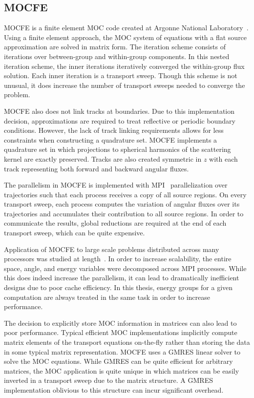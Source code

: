 \subsection{MOCFE}
\label{sec:mocfe}

MOCFE is a finite element \ac{MOC} code created at Argonne National Laboratory~\cite{mocfe_init}. Using a finite element approach, the \ac{MOC} system of equations with a flat source approximation are solved in matrix form. The iteration scheme consists of iterations over between-group and within-group components. In this nested iteration scheme, the inner iterations iteratively converged the within-group flux solution. Each inner iteration is a transport sweep. Though this scheme is not unusual, it does increase the number of transport sweeps needed to converge the problem.

MOCFE also does not link tracks at boundaries. Due to this implementation decision, approximations are required to treat reflective or periodic boundary conditions. However, the lack of track linking requirements allows for less constraints when constructing a quadrature set. MOCFE implements a quadrature set in which projections to spherical harmonics of the scattering kernel are exactly preserved. Tracks are also created symmetric in $z$ with each track representing both forward and backward angular fluxes.

The parallelism in MOCFE is implemented with \ac{MPI}~\cite{mpi} parallelization over trajectories such that each process receives a copy of all source regions. On every transport sweep, each process computes the variation of angular fluxes over its trajectories and accumulates their contribution to all source regions. In order to communicate the results, global reductions are required at the end of each transport sweep, which can be quite expensive.

Application of MOCFE to large scale problems distributed across many processors was studied at length~\cite{mocfe_bgp}. In order to increase scalability, the entire space, angle, and energy variables were decomposed across \ac{MPI} processes. While this does indeed increase the parallelism, it can lead to dramatically inefficient designs due to poor cache efficiency. In this thesis, energy groups for a given computation are always treated in the same task in order to increase performance.

The decision to explicitly store \ac{MOC} information in matrices can also lead to poor performance. Typical efficient \ac{MOC} implementations implicitly compute matrix elements of the transport equations on-the-fly rather than storing the data in some typical matrix representation.  MOCFE uses a \ac{GMRES} linear solver to solve the \ac{MOC} equations. While \ac{GMRES} can be quite efficient for arbitrary matrices, the  \ac{MOC} application is quite unique in which matrices can be easily inverted in a transport sweep due to the matrix structure. A \ac{GMRES} implementation oblivious to this structure can incur significant overhead.

